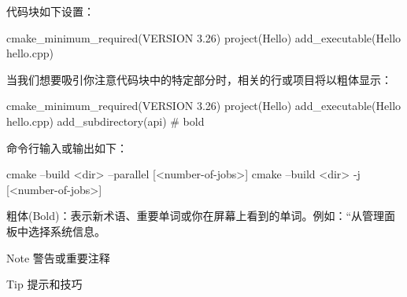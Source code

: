 代码块如下设置：

\begin{cmake}
cmake_minimum_required(VERSION 3.26)
project(Hello)
add_executable(Hello hello.cpp)
\end{cmake}

当我们想要吸引你注意代码块中的特定部分时，相关的行或项目将以粗体显示：

\begin{cmake}
cmake_minimum_required(VERSION 3.26)
project(Hello)
add_executable(Hello hello.cpp)
add_subdirectory(api) # bold
\end{cmake}

命令行输入或输出如下：

\begin{shell}
cmake --build <dir> --parallel [<number-of-jobs>]
cmake --build <dir> -j [<number-of-jobs>]
\end{shell}

粗体(Bold)：表示新术语、重要单词或你在屏幕上看到的单词。例如：“从管理面板中选择系统信息。

\begin{myNotic}{Note}
警告或重要注释
\end{myNotic}


\begin{myTip}{Tip}
提示和技巧
\end{myTip}






